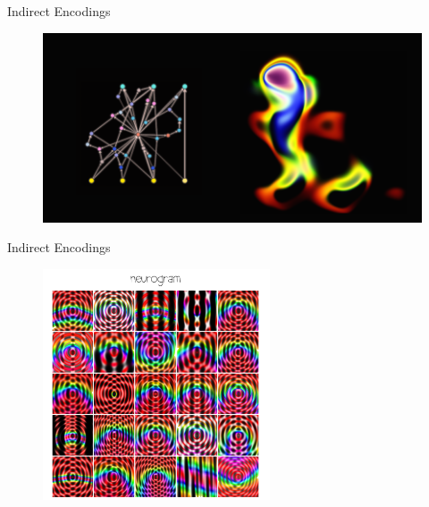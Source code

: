 \begin{frame}{Indirect Encodings}
\begin{figure}
  \includegraphics[width=\textwidth]{img/twitter_walking_fish.png}
  \captionsetup{singlelinecheck=off,justification=raggedright}  
  \caption{\cite{Ha2015Neurogram}}
\end{figure}
\end{frame}

\begin{frame}{Indirect Encodings}
\begin{figure}
  \includegraphics[width=0.6\textwidth]{img/neurogram.png}
  \captionsetup{singlelinecheck=off,justification=raggedright}
  \caption{\cite{Ha2015Neurogram}}
\end{figure}
\end{frame}


